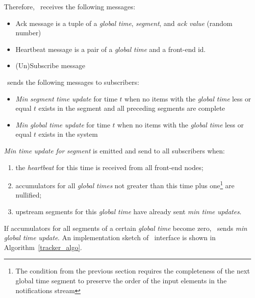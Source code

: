 Therefore, \tracker\ receives the following messages:
\begin{itemize}
    \item Ack message is a tuple of a \textit{global time}, \textit{segment}, and \textit{ack value} (random number)
    \item Heartbeat message is a pair of a \textit{global time} and a front-end id.
    \item (Un)Subscribe message
\end{itemize}


\tracker\ sends the following messages to subscribers:
\begin{itemize}
    \item \textit{Min segment time update} for time $t$ when no items with the \textit{global time} less or equal $t$ exists in the segment and all preceding segments are complete
    \item \textit{Min global time update} for time $t$ when no items with the \textit{global time} less or equal $t$ exists in the system
\end{itemize}

\textit{Min time update for segment} is emitted and send to all subscribers when:
\begin{enumerate}
    \item the \textit{heartbeat} for this time is received from all front-end nodes;
    \item accumulators for all \textit{global times} not greater than this time plus one\footnote{The condition from the previous section requires the completeness of the next global time segment to preserve the order of the input elements in the notifications stream} are nullified;
    \item upstream segments for this \textit{global time} have already sent \textit{min time updates}.
\end{enumerate}
If accumulators for all segments of a certain \textit{global time} become zero, \tracker\ sends \textit{min global time update}. An implementation sketch of \tracker\ interface is shown in Algorithm~\ref{tracker_algo}.

